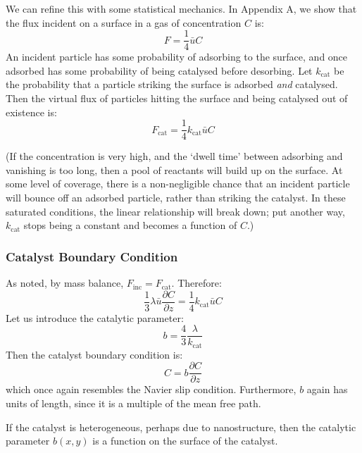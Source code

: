 \documentclass[a4paper]{report}
\newcommand{\Finc}{\ensuremath{F_{\mathrm{inc}}}}
\newcommand{\Fcat}{\ensuremath{F_{\mathrm{cat}}}}
\newcommand{\kcat}{\ensuremath{k_{\mathrm{cat}}}}
\begin{document}
We can refine this with some statistical mechanics.  In Appendix A, we show that the flux incident on a surface in a gas of concentration $C$ is:
\begin{equation}
F = \frac{1}{4} \bar{u} C
\end{equation}
An incident particle has some probability of adsorbing to the surface, and once adsorbed has some probability of being catalysed before desorbing.  Let $\kcat$ be the probability that a particle striking the surface is adsorbed \emph{and} catalysed.  Then the virtual flux of particles hitting the surface and being catalysed out of existence is:
\begin{equation}
\Fcat = \frac{1}{4} \kcat \bar{u} C
\end{equation}

(If the concentration is very high, and the `dwell time' between adsorbing and vanishing is too long, then a pool of reactants will build up on the surface.  At some level of coverage, there is a non-negligible chance that an incident particle will bounce off an adsorbed particle, rather than striking the catalyst.  In these saturated conditions, the linear relationship will break down; put another way, $\kcat$ stops being a constant and becomes a function of $C$.)


\subsubsection*{Catalyst Boundary Condition}

As noted, by mass balance, $\Finc = \Fcat$. Therefore:
\begin{equation}
\frac{1}{3} \lambda \bar{u} \frac{\partial C}{\partial z} = \frac{1}{4} \kcat \bar{u} C
\end{equation}
Let us introduce the catalytic parameter:
\begin{equation}
b = \frac{4}{3} \frac{\lambda}{\kcat}
\end{equation}
Then the catalyst boundary condition is:
\begin{equation}
C = b \frac{\partial C}{\partial z}
\end{equation}
which once again resembles the Navier slip condition.
Furthermore, $b$ again has units of length, since it is a multiple of the mean free path.

If the catalyst is heterogeneous, perhaps due to nanostructure, then the catalytic parameter $b(x,y)$ is a function on the surface of the catalyst.

\vspace*{1em}
\end{document}
